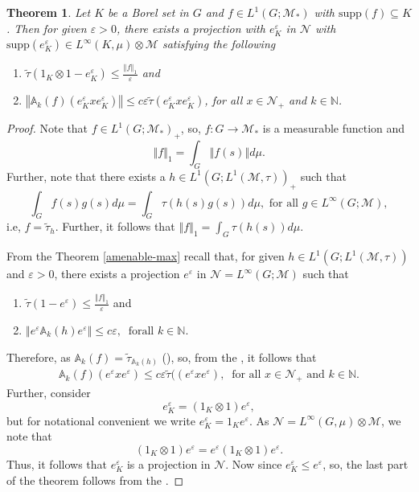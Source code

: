 \documentclass[11pt]{amsart}
\newtheorem{thm}{Theorem}[section]
\theoremstyle{definition}
\theoremstyle{myremark}
\numberwithin{equation}{section}
\def\A{\mathbb A}
\def\N{\mathbb N}
\newcommand{\CM}{\mathcal{M}}
\newcommand{\CN}{\mathcal{N}}
\newcommand{\eps}{\varepsilon}
\newcommand{\norm}[1]{\left\Vert#1\right\Vert}
\begin{document}
\begin{thm}\label{maxthm}
   Let $K$ be a Borel set in $G$ and  $ f \in L^1(G; \CM_*)$ with $\text{supp}(f) \subseteq K$.  Then for given  $\eps >0$, there exists a projection with $e_K^\eps $ in $\CN$ with $\text{supp}(e_K^\eps) \in L^\infty( K,\mu) \otimes \CM$  satisfying the following 
    \begin{enumerate}\setlength\itemsep{.7em} 
        \item $ \widetilde{ \tau }( 1_K\otimes 1-e_K^\eps) \leq \frac{\norm{ f}_1}{ \eps}$ and 
        \item $ \norm{ \A_k(f)( e^\eps_K  x e^\eps_K  )} \leq c \eps \widetilde{\tau}( e^\eps_K  x e^\eps_K ) $,  for all $x \in \CN_+$ and   $k \in \N$.
    \end{enumerate}
\end{thm}
\begin{proof}
Note that  $ f \in L^1(G; \CM_*)_+$, so, $ f : G \to \CM_*$ is a measurable function and 
$$\norm{ f}_1 = \int_G \norm {f(s)} d\mu.$$
Further, note that there exists a $h \in L^1(G; L^1(\CM, \tau))_+ $ such that 
$$ \int_G f(s) g(s) d\mu   = \int_G \tau( h(s)g(s)  ) d\mu,  \text{ for all } g \in L^\infty( G; \CM),$$
 i.e, $f = \widetilde{\tau}_h $.  Further, it follows that
 $ \norm{f}_1= \int_G \tau( h(s)) d\mu.$


\noindent From the Theorem \ref{amenable-max} recall that, for given $h \in L^1(G; L^1( \CM, \tau) )$  and $ \eps >0$, there exists a projection $ e^\eps$ in  $\CN=L^\infty(G; \CM )$ such that   
\begin{enumerate}
        \item $ \widetilde{\tau}( 1-e^\eps) \leq \frac{\norm{ f}_1}{ \eps}$ and 
        \item $ \norm{ e^\eps \A_k(h) e^\eps }\leq c \eps, ~ \text{ forall } k \in \N.$
    \end{enumerate}
Therefore, as $ \A_k(f) = \widetilde{\tau}_{ \A_k(h)}$ (), so,  from the , it follows that 
\begin{align}\label{max-ine-Eq}
  \A_k(f) ( e^\eps x e^\eps)  \leq c \eps \widetilde{ \tau}(( e^\eps x e^\eps)  , ~ \text{ for all }  x \in \CN_+ \text{ and } k \in \N.
\end{align}
Further,  consider $$e_K^\eps = (1_K \otimes 1) e^\eps,$$
but for notational convenient we write
$ e_K^\eps = 1_K  e^\eps$.  As $ \CN = L^\infty(G, \mu) \otimes \CM$, we note that 
$$(1_K \otimes 1) e^\eps= e^\eps (1_K \otimes 1) e^\eps.$$
Thus, it follows that $e^\eps_K$ is a projection in $\CN$.  
Now since $ e^\eps_K \leq e^\eps$, so, the last part of the theorem follows from the   .

\end{proof}
\end{document}
